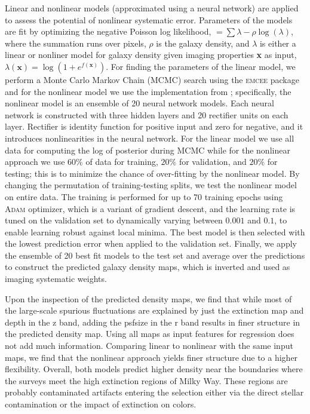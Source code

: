 Linear and nonlinear models (approximated using a neural network) are applied to assess the potential of nonlinear systematic error. Parameters of the models are fit by optimizing the negative Poisson log likelihood, $= \sum \lambda - \rho \log(\lambda)$, where the summation runs over pixels, $\rho$ is the galaxy density, and $\lambda$ is either a linear or nonliner model for galaxy density given imaging properties \textbf{x} as input, $\lambda(\textbf{x}) = \log (1+e^{f(\textbf{x})})$. For finding the parameters of the linear model, we perform a Monte Carlo Markov Chain (MCMC) search using the \textsc{emcee} package  and for the nonlinear model we use the implementation from \cite{rezaie2021primordial}; specifically, the nonlinear model is an ensemble of 20 neural network models. Each neural network is constructed with three hidden layers and 20 rectifier units on each layer. Rectifier is identity function for positive input and zero for negative, and it introduces nonlinearities in the neural network. For the linear model we use all data for computing the log of posterior during MCMC while for the nonlinear approach we use $60\%$ of data for training, $20\%$ for validation, and $20\%$ for testing; this is to minimize the chance of over-fitting by the nonlinear model. By changing the permutation of training-testing splits, we test the nonlinear model on entire data. The training is performed for up to 70 training epochs using \textsc{Adam} optimizer, which is a variant of gradient descent, and the learning rate is tuned on the validation set to dynamically varying between $0.001$ and $0.1$, to enable learning robust against local minima. The best model is then selected with the lowest prediction error when applied to the validation set. Finally, we apply the ensemble of 20 best fit models to the test set and average over the predictions to construct the predicted galaxy density maps, which is inverted and used as imaging systematic weights. 

Upon the inspection of the predicted density maps, we find that while most of the large-scale spurious fluctuations are explained by just the extinction map and depth in the z band, adding the psfsize in the r band results in finer structure in the predicted density map. Using all maps as input features for regression does not add much information. Comparing linear to nonlinear with the same input maps, we find that the nonlinear approach yields finer structure due to a higher flexibility.  Overall, both models predict higher density near the boundaries where the surveys meet the high extinction regions of Milky Way. These regions are probably contaminated artifacts entering the selection either via the direct stellar contamination or the impact of extinction on colors.

